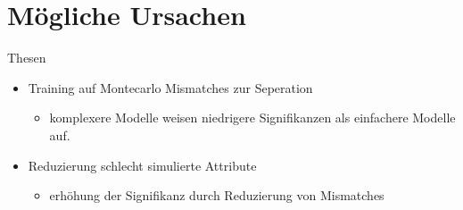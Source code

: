 \documentclass[aspectratio=1610, professionalfonts, 9pt]{beamer}
\begin{document}
\section{Mögliche Ursachen}

\begin{frame}{Thesen}
  \begin{itemize}
	\item<1-> Training auf Montecarlo Mismatches zur Seperation
	  \begin{itemize}
		\item komplexere Modelle weisen niedrigere Signifikanzen als einfachere Modelle auf.
	  \end{itemize}
	\item<2> Reduzierung schlecht simulierte Attribute
	  \begin{itemize}
		\item erhöhung der Signifikanz durch Reduzierung von Mismatches
	  \end{itemize}
  \end{itemize}
\end{frame}
\end{document}
